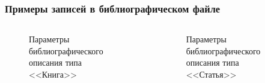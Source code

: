 \documentclass[aspectratio=169]{beamer}
\begin{document}
\begin{frame}
\frametitle{Примеры записей в библиографическом файле}
\medskip
\begin{columns}
\begin{figure}
\centering
{}
\caption{Параметры библиографического описания типа <<Книга>>}
\end{figure}
\begin{figure}
\centering
{}
\caption{Параметры библиографического описания типа <<Статья>>}
\end{figure}
\end{columns}
\end{frame}
\end{document}
